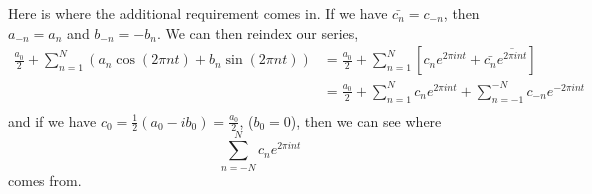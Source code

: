 Here is where the additional requirement comes in.
If we have $\bar{c_n} = c_{-n}$, then $a_{-n} = a_n$ and $b_{-n} = -b_n$.
We can then reindex our series,
\begin{align*}
\frac{a_0}{2} + \sum^{N}_{n=1} \left(a_n \cos(2\pi nt) + b_n \sin(2\pi nt)\right)
&= \frac{a_0}{2} + \sum^{N}_{n=1} \left[ c_n e^{2\pi int} + \bar{c_n} \overline{e^{2\pi int}} \right] \\
&= \frac{a_0}{2} + \sum^{N}_{n=1} c_n e^{2\pi int} + \sum^{-N}_{n=-1} c_{-n} e^{-2\pi int} \\
\end{align*}
and if we have $c_0 = \frac{1}{2}(a_0 - ib_0) = \frac{a_0}{2}$, ($b_0 = 0$),
then we can see where
$$
\sum^{N}_{n=-N} c_n e^{2\pi int}
$$
comes from.